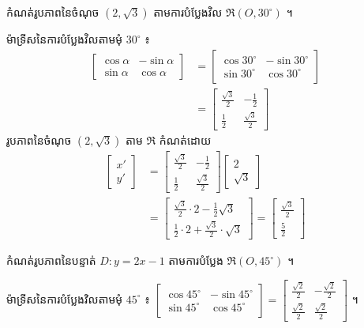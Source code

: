 \begin{example}[លំហាត់គំរូ ១]
កំណត់រូបភាពនៃចំណុច $(2, \sqrt{3})$ តាមការបំប្លែងវិល $\mathfrak{R}(O, 30^\circ)$ ។
\end{example}
\ans
ម៉ាទ្រីសនៃការបំប្លែងវិលតាមមុំ $30^\circ$ ៖
\[
\begin{aligned}
\begin{bmatrix} \cos\alpha & -\sin\alpha\\ \sin\alpha & \cos\alpha \end{bmatrix} &= \begin{bmatrix} \cos 30^\circ & -\sin 30^\circ\\ \sin 30^\circ & \cos 30^\circ \end{bmatrix}\\
&= \begin{bmatrix} \frac{\sqrt{3}}{2} & -\frac{1}{2}\\[3pt] \frac{1}{2} & \frac{\sqrt{3}}{2} \end{bmatrix}
\end{aligned}
\]
រូបភាពនៃចំណុច $(2, \sqrt{3})$ តាម $\mathfrak{R}$ កំណត់ដោយ
\[
\begin{aligned}
\begin{bmatrix} x'\\ y' \end{bmatrix} &= \begin{bmatrix} \frac{\sqrt{3}}{2} & -\frac{1}{2}\\[3pt] \frac{1}{2} & \frac{\sqrt{3}}{2} \end{bmatrix}\begin{bmatrix} 2\\ \sqrt{3} \end{bmatrix}\\
&= \begin{bmatrix} \frac{\sqrt{3}}{2}\cdot 2 - \frac{1}{2}\sqrt{3}\\[3pt] \frac{1}{2}\cdot 2 + \frac{\sqrt{3}}{2}\cdot\sqrt{3} \end{bmatrix} = \begin{bmatrix} \frac{\sqrt{3}}{2}\\[3pt] \frac{5}{2} \end{bmatrix}
\end{aligned}
\]

\begin{example}[លំហាត់គំរូ ២]
កំណត់រូបភាពនៃបន្ទាត់ $D : y = 2x - 1$ តាមការបំប្លែង $\mathfrak{R}(O, 45^\circ)$ ។
\end{example}
\ans
ម៉ាទ្រីសនៃការបំប្លែងវិលតាមមុំ $45^\circ$ ៖ $\begin{bmatrix} \cos 45^\circ & -\sin 45^\circ\\ \sin 45^\circ & \cos 45^\circ \end{bmatrix} = \begin{bmatrix} \frac{\sqrt{2}}{2} & -\frac{\sqrt{2}}{2}\\[3pt] \frac{\sqrt{2}}{2} & \frac{\sqrt{2}}{2} \end{bmatrix}$ ។

